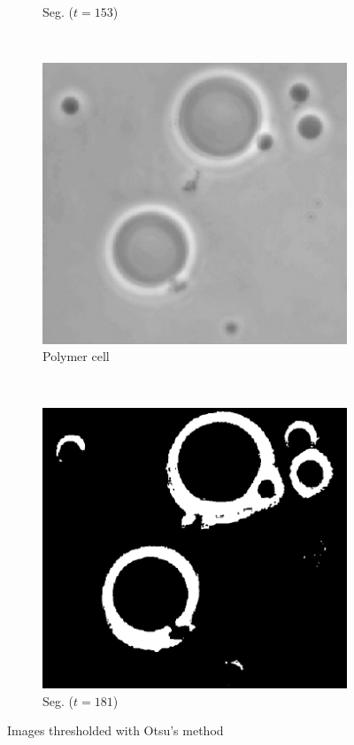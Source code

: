 \documentclass[]{article}
\begin{document}
\begin{figure}[H]
\begin{subfigure}{0.25\textwidth}
        \caption{Seg. ($t=153$)}
    \end{subfigure}%
    ~
    \begin{subfigure}{0.25\textwidth}
        \centering
        \includegraphics[width=\textwidth]{img/before/polymercell}
        \caption{Polymer cell}
    \end{subfigure}%
    ~
    \begin{subfigure}{0.25\textwidth}
        \centering
        \includegraphics[width=\textwidth]{img/polymercell-segmented}
        \caption{Seg. ($t=181$)}
    \end{subfigure}
    \caption{Images thresholded with Otsu's method}
    \label{fig:otsu}
\end{figure}
\end{document}
